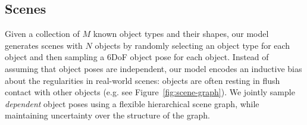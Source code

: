 \subsection{Scenes} \label{sec:scenes} %

Given a collection of $M$ known object types and their shapes, our model generates scenes with $N$ objects by randomly selecting an object type for each object and then sampling a 6DoF object pose for each object.
Instead of assuming that object poses are independent, 
our model encodes an inductive bias about the regularities in real-world scenes:
objects are often resting in flush contact with other objects (e.g. see Figure~\ref{fig:scene-graph}).
We jointly sample \emph{dependent} object poses using a flexible hierarchical scene graph, while maintaining uncertainty over the structure of the graph. 

